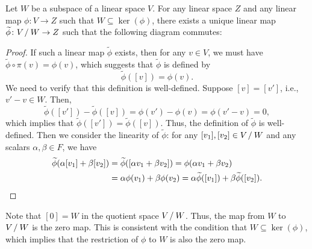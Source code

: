 \begin{proposition}\label{prop:universal_property_quotient_space}
  Let $W$ be a subspace of a linear space $V$. For any linear space $Z$ and any linear map $\phi \colon V \to Z$ such that $W \subseteq \ker(\phi)$, there exists a unique linear map $\widetilde{\phi} \colon V \mathbin{/} W \to Z$ such that the following diagram commutes:
  \begin{center}
  \end{center}
\end{proposition}
\begin{proof}
  If such a linear map $\widetilde{\phi}$ exists, then for any $v \in V$, we must have $\widetilde{\phi} \circ \pi (v) = \phi(v)$, which suggests that $\widetilde{\phi}$ is defined by
  \[
    \widetilde{\phi}([v]) = \phi(v).
  \]
  We need to verify that this definition is well-defined. Suppose $[v] = [v']$, i.e., $v' - v \in W$. Then,
  \[
    \widetilde{\phi}([v']) - \widetilde{\phi}([v]) = \phi(v') - \phi(v) = \phi(v' - v) = 0,
  \]
  which implies that $\widetilde{\phi}([v']) = \widetilde{\phi}([v])$. Thus, the definition of $\widetilde{\phi}$ is well-defined. Then we consider the linearity of $\widetilde{\phi}$: for any $[v_1], [v_2] \in V \mathbin{/} W$ and any scalars $\alpha, \beta \in F$, we have
  \begin{align*}
    \widetilde{\phi}(\alpha [v_1] + \beta [v_2]) & = \widetilde{\phi}([\alpha v_1 + \beta v_2]) = \phi(\alpha v_1 + \beta v_2)                                     \\
                                                 & = \alpha \phi(v_1) + \beta \phi(v_2) = \alpha \widetilde{\phi}([v_1]) + \beta \widetilde{\phi}([v_2]). \qedhere
  \end{align*}
\end{proof}

\begin{remark}
  Note that $[0] = W$ in the quotient space $V \mathbin{/} W$. Thus, the map from $W$ to $V \mathbin{/} W$ is the zero map. This is consistent with the condition that $W \subseteq \ker(\phi)$, which implies that the restriction of $\phi$ to $W$ is also the zero map.
\end{remark}

